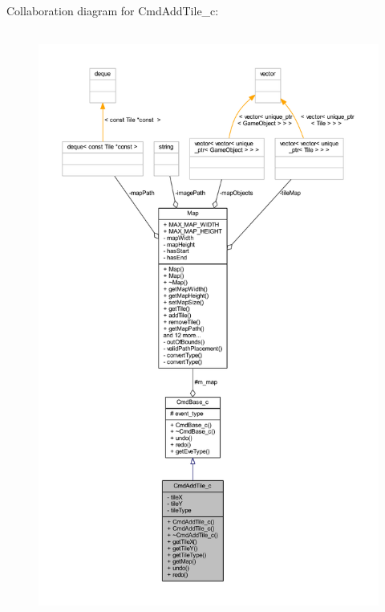 Collaboration diagram for Cmd\+Add\+Tile\+\_\+c\+:\nopagebreak
\begin{figure}[H]
\begin{center}
\leavevmode
\includegraphics[height=550pt]{class_cmd_add_tile__c__coll__graph}
\end{center}
\end{figure}
